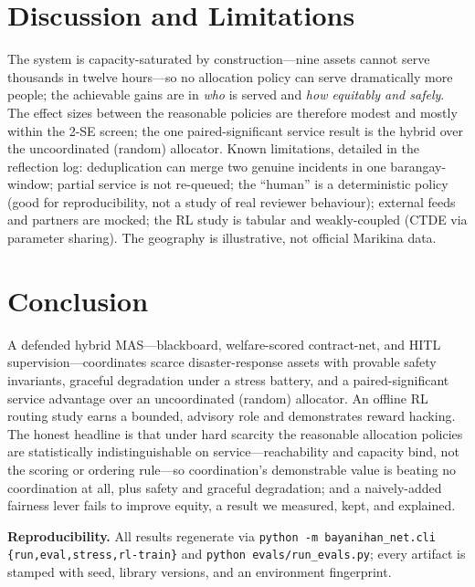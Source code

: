 \documentclass[11pt]{article}
\begin{document}
\section{Discussion and Limitations}
The system is capacity-saturated by construction---nine assets cannot serve thousands in twelve hours---so
no allocation policy can serve dramatically more people; the achievable gains are in \emph{who} is served
and \emph{how equitably and safely}. The effect sizes between the reasonable policies are therefore modest
and mostly within the 2-SE screen; the one paired-significant service result is the hybrid over the
uncoordinated (random) allocator. Known limitations, detailed in the reflection log: deduplication can merge two
genuine incidents in one barangay-window; partial service is not re-queued; the ``human'' is a
deterministic policy (good for reproducibility, not a study of real reviewer behaviour); external feeds and
partners are mocked; the RL study is tabular and weakly-coupled (CTDE via parameter sharing). The geography
is illustrative, not official Marikina data.

\section{Conclusion}
A defended hybrid MAS---blackboard, welfare-scored contract-net, and HITL supervision---coordinates scarce
disaster-response assets with provable safety invariants, graceful degradation under a stress battery, and
a paired-significant service advantage over an uncoordinated (random) allocator. An offline RL routing
study earns a bounded, advisory role and demonstrates reward hacking. The honest headline is that under
hard scarcity the reasonable allocation policies are statistically indistinguishable on service---reachability
and capacity bind, not the scoring or ordering rule---so coordination's demonstrable value is beating no
coordination at all, plus safety and graceful degradation; and a naively-added fairness lever fails to
improve equity, a result we measured, kept, and explained.

\vspace{1em}
\noindent\textbf{Reproducibility.} All results regenerate via
\texttt{python -m bayanihan\_net.cli \{run,eval,stress,rl-train\}} and
\texttt{python evals/run\_evals.py}; every artifact is stamped with seed, library versions, and an
environment fingerprint.
\end{document}
